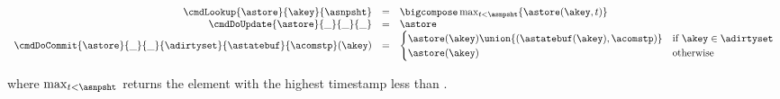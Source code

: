 
\[
  \begin{array}{rcl}
    \cmdLookup{\astore}{\akey}{\asnpsht} & = &
        \bigcompose \max_{t < \asnpsht} \{ \astore(\akey, t) \}
    \\
    \cmdDoUpdate{\astore}{\_}{\_}{\_}    & = & \astore
    \\
    \cmdDoCommit{\astore}{\_}{\_}{\adirtyset}{\astatebuf}{\acomstp}(\akey)
    & = & 
      \begin{cases}
         \astore(\akey) \union \{(\astatebuf(\akey), \acomstp)\} 
            & \text{if}\ \akey \in \adirtyset
        \\
         \astore(\akey) & \text{otherwise}
       \end{cases}
    \\
  \end{array}
\]
%
\begin{flushleft}
  where $\max_{t < \asnpsht}$ returns the element with the highest
  timestamp less than \asnpsht{}.
\end{flushleft}



